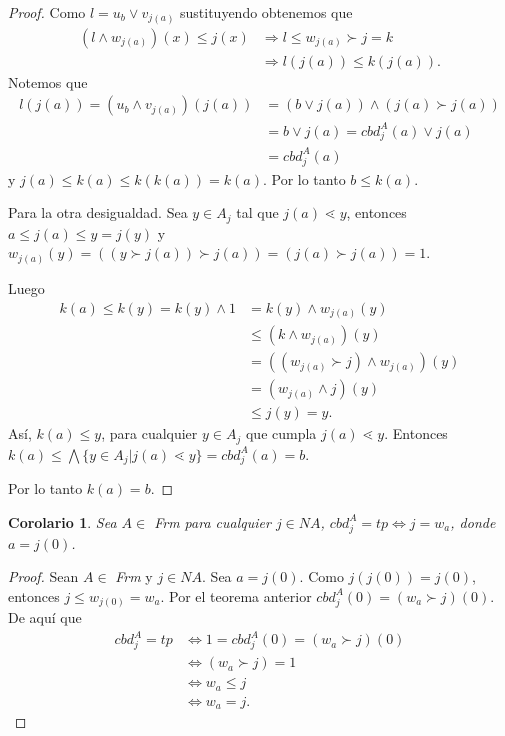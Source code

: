 \documentclass[12pt,letterpaper,titlepage]{article}
\newtheorem*{cor}{Corolario}
\theoremstyle{definition}
\newcommand\<{\langle}
\renewcommand\>{\rangle}
\begin{document}
\begin{proof}
Como $l=u_b\vee v_{j(a)}$ sustituyendo obtenemos que 
\begin{equation*}
\begin{split}
(l\wedge w_{j(a)})(x)\leq j(x) & \Rightarrow l\leq w_{j(a)}\succ j=k\\
& \Rightarrow l(j(a))\leq k(j(a)).
\end{split}
\end{equation*}
Notemos que 
\begin{equation*}
\begin{split}
l(j(a))=(u_b\wedge v_{j(a)})(j(a))& =(b\vee j(a))\wedge (j(a)\succ j(a))\\
& =b\vee j(a)=cbd_j^A(a)\vee j(a)\\
& =cbd_j^A(a)
\end{split}
\end{equation*}
y $j(a)\leq k(a)\leq k(k(a))=k(a)$. Por lo tanto $b\leq k(a)$.

Para la otra desigualdad. Sea $y\in A_j$ tal que $j(a)\lessdot y$, entonces $a\leq j(a)\leq y=j(y)$ y $w_{j(a)}(y)=((y\succ j(a))\succ j(a))=(j(a)\succ j(a))=1$.

Luego 
\begin{equation*}
\begin{split}
k(a)\leq k(y)=k(y)\wedge 1 & =k(y)\wedge w_{j(a)}(y)\\
& \leq (k\wedge w_{j(a)})(y)\\
& =((w_{j(a)}\succ j)\wedge w_{j(a)})(y)\\
& =(w_{j(a)}\wedge j)(y)\\
& \leq j(y)=y.
\end{split}
\end{equation*}
Así, $k(a)\leq y$, para cualquier $y\in A_j$ que cumpla $j(a)\lessdot y$. Entonces $k(a)\leq \bigwedge\{y\in A_j|j(a)\lessdot y\}=cbd_j^A(a)=b$.

\noindent
Por lo tanto $k(a)=b$.
\end{proof}

\begin{cor}
Sea $A\in$ \textit{Frm} para cualquier $j\in NA$, $cbd_j^A=tp\Leftrightarrow j=w_a$, donde $a=j(0)$.
\end{cor}

\begin{proof}
Sean $A\in$ \textit{Frm} y $j\in NA$. Sea $a=j(0)$. Como $j(j(0))=j(0)$, entonces $j\leq w_{j(0)}=w_a$. Por el teorema anterior $cbd_j^A(0)=(w_a\succ j)(0)$. De aquí que
\begin{equation*}
\begin{split}
cbd_j^A=tp & \Leftrightarrow 1=cbd_j^A(0)=(w_a\succ j)(0)\\
& \Leftrightarrow (w_a\succ j)=1\\ 
& \Leftrightarrow w_a\leq j\\
& \Leftrightarrow w_a=j.
\end{split}
\end{equation*}

\end{proof}
\end{document}
